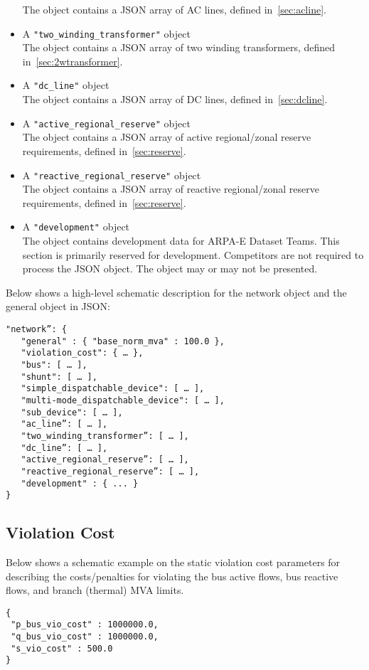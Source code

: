 \begin{itemize}
    The object contains a JSON array of AC lines, defined in~\ref{sec:acline}.
    \item A \texttt{"two\_winding\_transformer"} object\\
    The object contains a JSON array of two winding transformers, defined in~\ref{sec:2wtransformer}.
    \item A \texttt{"dc\_line"} object\\
    The object contains a JSON array of DC lines, defined in~\ref{sec:dcline}.
    \item A \texttt{"active\_regional\_reserve"} object\\
    The object contains a JSON array of active regional/zonal reserve requirements, defined in~\ref{sec:reserve}.
    \item A \texttt{"reactive\_regional\_reserve"} object\\
    The object contains a JSON array of reactive regional/zonal reserve requirements, defined in~\ref{sec:reserve}.
    \item A \texttt{"development"} object\\
    The object contains development data for ARPA-E Dataset Teams. This section is primarily reserved for development. Competitors are not required to process the JSON object. The object may or may not be presented. 
\end{itemize}

Below shows a high-level schematic description for the network object and the general object in JSON:
\begin{verbatim}
"network”: {
   "general" : { "base_norm_mva" : 100.0 },
   "violation_cost": { … },
   "bus": [ … ],
   "shunt": [ … ],
   "simple_dispatchable_device": [ … ],
   "multi-mode_dispatchable_device": [ … ],
   "sub_device": [ … ],
   "ac_line”: [ … ],
   "two_winding_transformer”: [ … ],
   "dc_line”: [ … ],   
   "active_regional_reserve”: [ … ],
   "reactive_regional_reserve”: [ … ],
   "development" : { ... }
}    
\end{verbatim}

\subsection{Violation Cost}
\label{sec:violation}
Below shows a schematic example on the static violation cost parameters for 
describing the costs/penalties for violating the bus active flows, bus reactive flows, 
and branch (thermal) MVA limits. 

\begin{verbatim}
{
 "p_bus_vio_cost" : 1000000.0,
 "q_bus_vio_cost" : 1000000.0,
 "s_vio_cost" : 500.0
}
\end{verbatim}


